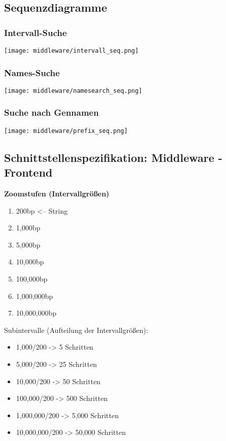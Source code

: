 \documentclass{scrartcl}
\begin{document}
\newpage
\subsection{Sequenzdiagramme}
\subsubsection{Intervall-Suche}
\texttt{[image: middleware/intervall\_seq.png]}
\subsubsection{Names-Suche}
\texttt{[image: middleware/namesearch\_seq.png]}
\subsubsection{Suche nach Gennamen}
\texttt{[image: middleware/prefix\_seq.png]}
\newpage\hfill\\
\subsection{Schnittstellenspezifikation: Middleware - Frontend}
\textbf{Zoomstufen (Intervallgrößen)}
\begin{enumerate}
\item 200bp   <-- String
\item 1,000bp
\item 5,000bp
\item 10,000bp
\item 100,000bp
\item 1,000,000bp
\item 10,000,000bp
\end{enumerate}
\vspace*{0.5cm}
Subintervalle (Aufteilung der Intervallgrößen):
\begin{itemize}
\item 1,000/200 -> 5 Schritten
\item 5,000/200 -> 25 Schritten
\item 10,000/200 -> 50 Schritten
\item 100,000/200 -> 500 Schritten
\item 1,000,000/200 -> 5,000 Schritten
\item 10,000,000/200 -> 50,000 Schritten
\end{itemize}
\end{document}
